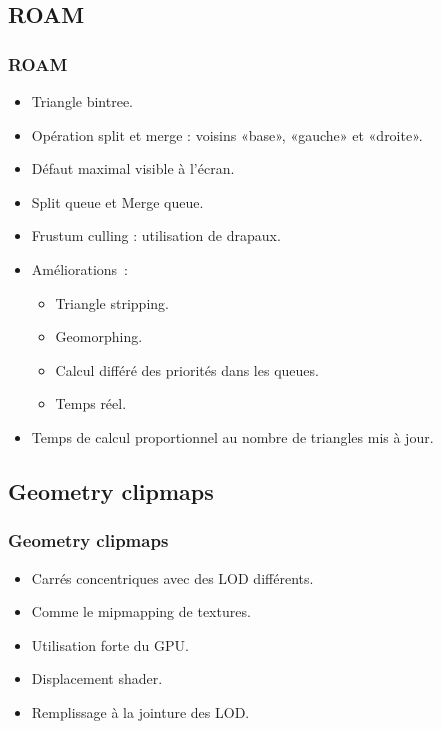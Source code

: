 \documentclass{beamer}
\begin{document}
\subsection{ROAM}
\begin{frame}
  \frametitle{ROAM}
  \begin{itemize}
  \item Triangle bintree.
  \item Opération split et merge : voisins «base», «gauche» et «droite».
  \item Défaut maximal visible à l'écran.
  \item Split queue et Merge queue.
  \item Frustum culling : utilisation de drapaux.
  \item Améliorations~:
    \begin{itemize}
    \item Triangle stripping.
    \item Geomorphing.
    \item Calcul différé des priorités dans les queues.
    \item Temps réel.
    \end{itemize}
  \item Temps de calcul proportionnel au nombre de triangles mis à jour.
  \end{itemize}
\end{frame}

\subsection{Geometry clipmaps}
\begin{frame}
  \frametitle{Geometry clipmaps}
  \begin{itemize}
  \item Carrés concentriques avec des LOD différents.
  \item Comme le mipmapping de textures.
  \item Utilisation forte du GPU.
  \item Displacement shader.
  \item Remplissage à la jointure des LOD.
  \end{itemize}
\end{frame}
\end{document}
